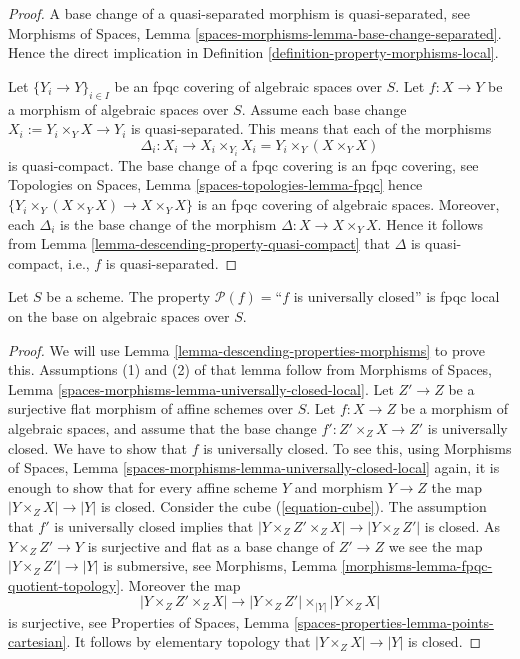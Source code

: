 \begin{proof}
A base change of a quasi-separated morphism is quasi-separated, see
Morphisms of Spaces,
Lemma \ref{spaces-morphisms-lemma-base-change-separated}.
Hence the direct implication in
Definition \ref{definition-property-morphisms-local}.

\medskip\noindent
Let $\{Y_i \to Y\}_{i \in I}$ be an fpqc covering of algebraic spaces over $S$.
Let $f : X \to Y$ be a morphism of algebraic spaces over $S$.
Assume each base change $X_i := Y_i \times_Y X \to Y_i$ is quasi-separated.
This means that each of the morphisms
$$
\Delta_i :
X_i
\longrightarrow
X_i \times_{Y_i} X_i = Y_i \times_Y (X \times_Y X)
$$
is quasi-compact. The base change of a fpqc covering is an fpqc covering, see
Topologies on Spaces, Lemma \ref{spaces-topologies-lemma-fpqc}
hence $\{Y_i \times_Y (X \times_Y X) \to X \times_Y X\}$
is an fpqc covering of algebraic spaces. Moreover, each
$\Delta_i$ is the base change of the morphism
$\Delta : X \to X \times_Y X$. Hence it follows from
Lemma \ref{lemma-descending-property-quasi-compact}
that $\Delta$ is quasi-compact, i.e., $f$ is quasi-separated.
\end{proof}

\begin{lemma}
\label{lemma-descending-property-universally-closed}
Let $S$ be a scheme.
The property $\mathcal{P}(f) =$``$f$ is universally closed''
is fpqc local on the base on algebraic spaces over $S$.
\end{lemma}

\begin{proof}
We will use
Lemma \ref{lemma-descending-properties-morphisms}
to prove this. Assumptions (1) and (2) of that lemma follow from
Morphisms of Spaces,
Lemma \ref{spaces-morphisms-lemma-universally-closed-local}.
Let $Z' \to Z$ be a surjective flat morphism of affine schemes over $S$.
Let $f : X \to Z$ be a morphism of algebraic spaces, and assume
that the base change $f' : Z' \times_Z X \to Z'$ is universally closed.
We have to show that $f$ is universally closed. To see this, using
Morphisms of Spaces,
Lemma \ref{spaces-morphisms-lemma-universally-closed-local}
again, it is enough to show that for every affine scheme $Y$ and
morphism $Y \to Z$ the map $|Y \times_Z X| \to |Y|$ is closed.
Consider the cube (\ref{equation-cube}).
The assumption that $f'$ is universally closed implies that
$|Y \times_Z Z' \times_Z X| \to |Y \times_Z Z'|$ is closed.
As $Y \times_Z Z' \to Y$ is surjective and flat as a base change of $Z' \to Z$
we see the map $|Y \times_Z Z'| \to |Y|$ is submersive, see
Morphisms, Lemma \ref{morphisms-lemma-fpqc-quotient-topology}.
Moreover the map
$$
|Y \times_Z Z' \times_Z X|
\longrightarrow
|Y \times_Z Z'| \times_{|Y|} |Y \times_Z X|
$$
is surjective, see
Properties of Spaces, Lemma \ref{spaces-properties-lemma-points-cartesian}.
It follows by elementary topology that $|Y \times_Z X| \to |Y|$ is closed.
\end{proof}

